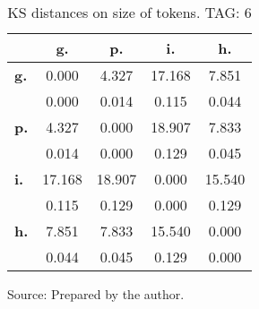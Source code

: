 \begin{table}[h!]
\begin{center}
\caption{KS distances on size of tokens. TAG: 6}
	\label{tab:kolTok}
\begin{tabular}{| l || c | c | c | c |}\hline
 & {\bf g.} & {\bf p.} & {\bf i.} & {\bf h.} \\\hline\hline
{\bf g.} & 0.000 & 4.327 & 17.168 & 7.851 \\
{\bf } & 0.000 & 0.014 & 0.115 & 0.044 \\\hline
{\bf p.} & 4.327 & 0.000 & 18.907 & 7.833 \\
{\bf } & 0.014 & 0.000 & 0.129 & 0.045 \\\hline
{\bf i.} & 17.168 & 18.907 & 0.000 & 15.540 \\
{\bf } & 0.115 & 0.129 & 0.000 & 0.129 \\\hline
{\bf h.} & 7.851 & 7.833 & 15.540 & 0.000 \\
{\bf } & 0.044 & 0.045 & 0.129 & 0.000 \\\hline
\end{tabular}
\begin{flushleft}
		Source: Prepared by the author.\
\end{flushleft}
\end{center}
\end{table}
